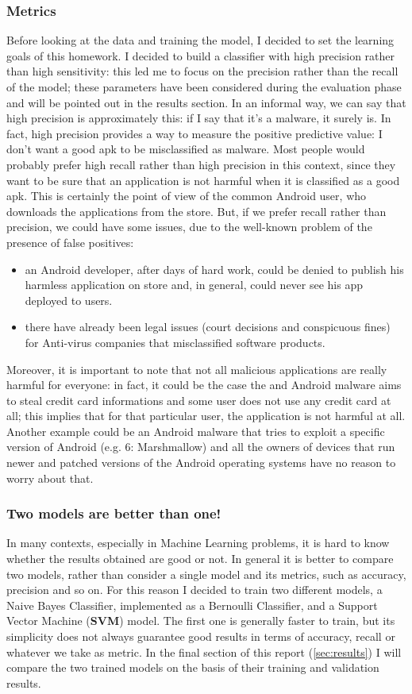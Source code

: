 \documentclass[12pt]{article}
\begin{document}
\subsubsection{Metrics}
Before looking at the data and training the model, I decided to set the learning goals of this homework. I decided to build a classifier with high precision rather than high sensitivity: this led me to focus on the precision rather than the recall of the model; these parameters have been considered during the evaluation phase and will be pointed out in the results section.
In an informal way, we can say that high precision is approximately this: if I say that it's a malware, it surely is. In fact, high precision provides a way to measure the positive predictive value: I don't want a good apk to be misclassified as malware.
Most people would probably prefer high recall rather than high precision in this context, since they want to be sure that an application is not harmful when it is classified as a good apk. This is certainly the point of view of the common Android user, who downloads the applications from the store. But, if we prefer recall rather than precision, we could have some issues, due to the well-known problem of the presence of false positives:
\begin{itemize}
\item an Android developer, after days of hard work, could be denied to publish his harmless application on store and, in general, could never see his app deployed to users.
\item there have already been legal issues (court decisions and conspicuous fines) for Anti-virus companies that misclassified software products.
\end{itemize}
Moreover, it is important to note that not all malicious applications are really harmful for everyone: in fact, it could be the case the and Android malware aims to steal credit card informations and some user does not use any credit card at all; this implies that for that particular user, the application is not harmful at all. Another example could be an Android malware that tries to exploit a specific version of Android (e.g. 6: Marshmallow) and all the owners of devices that run newer and patched versions of the Android operating systems have no reason to worry about that.
\subsubsection{Two models are better than one!}
\label{sec:models}
In many contexts, especially in Machine Learning problems, it is hard to know whether the results obtained are good or not. In general it is better to compare \cite{Main Book} two models, rather than consider a single model and its metrics, such as accuracy, precision and so on.
For this reason I decided to train two different models, a Naive Bayes Classifier, implemented as a Bernoulli Classifier, and a Support Vector Machine (\textbf{SVM}) model. The first one is generally faster to train, but its simplicity does not always guarantee good results in terms of accuracy, recall or whatever we take as metric.
In the final section of this report (\ref{sec:results}) I will compare the two trained models on the basis of their training and validation results. 
\end{document}

